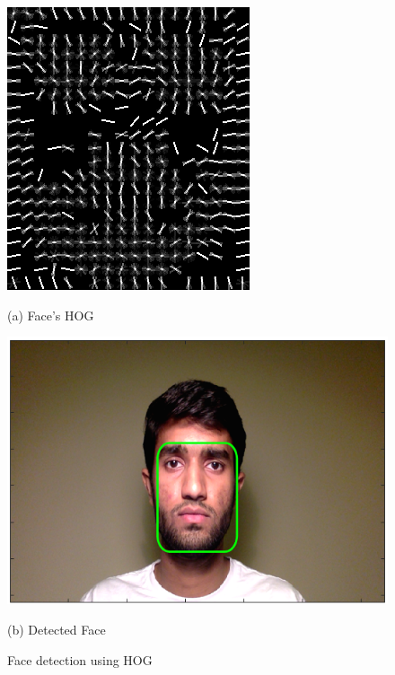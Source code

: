 \begin{figure}[htbp]
	\centering
	\begin{minipage}[t]{0.24\textwidth}\centering\includegraphics[width=\textwidth]{pics/faceHOG.png}\par(a) Face's HOG \end{minipage}
	\begin{minipage}[t]{0.74\textwidth}\centering\includegraphics[width=\textwidth]{pics/detectedFace.png}\par(b) Detected Face \end{minipage}
	\caption{Face detection using HOG}
	\label{fig:detection}
\end{figure}

